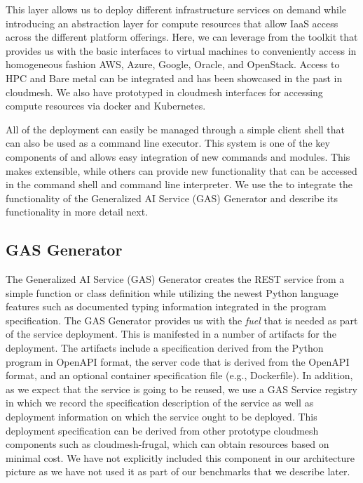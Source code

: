 This layer allows us to deploy different infrastructure services on
demand while introducing an abstraction layer for compute resources
that allow IaaS access across the different platform offerings. Here,
we can leverage from the \Cloudmesh toolkit that provides us with the
basic interfaces to virtual machines to conveniently access in
homogeneous fashion AWS, Azure, Google, Oracle, and OpenStack. Access
to HPC and Bare metal can be integrated and has been showcased in the
past in cloudmesh. We also have prototyped in cloudmesh interfaces for
accessing compute resources via docker and Kubernetes.

All of the deployment can easily be managed through a simple client
shell that can also be used as a command line executor. This system is
one of the key components of \Cloudmesh and allows easy integration of
new commands and modules. This makes \Cloudmesh extensible, while
others can provide new functionality that can be accessed in the
command shell and command line interpreter. We use the \Cloudmesh
{} to integrate the functionality of the Generalized AI
Service (GAS) Generator and describe its functionality in more detail
next.

\subsection{GAS Generator}

The Generalized AI Service (GAS)
Generator creates the REST service from a simple function or class
definition while utilizing the newest Python language features such as
documented typing information integrated in the program
specification. The GAS Generator provides us with the {\em fuel} that
is needed as part of the service deployment. This is manifested in a
number of artifacts for the deployment. The artifacts include a
specification derived from the Python program in OpenAPI format, the
server code that is derived from the OpenAPI format, and an optional
container specification file (e.g., Dockerfile). In addition, as we
expect that the service is going to be reused, we use a GAS Service
registry in which we record the specification description of the
service as well as deployment information on which the service ought
to be deployed. This deployment specification can be derived from
other prototype cloudmesh components such as cloudmesh-frugal, which
can obtain resources based on minimal cost. We have not explicitly
included this component in our architecture picture as we have not
used it as part of our benchmarks that we describe later.

